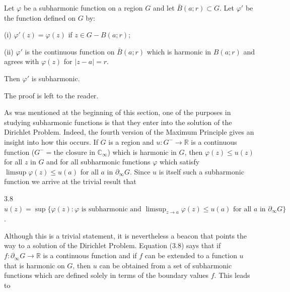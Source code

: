 Let $\varphi$ be a subharmonic function on a region $G$ and let $\bar{B}(a; r) \subset G$. Let $\varphi'$ be the function defined on $G$ by:

(i) $\varphi'(z) = \varphi(z)$ if $z \in G - B(a; r)$;

(ii) $\varphi'$ is the continuous function on $\bar{B}(a; r)$ which is harmonic in $B(a; r)$ and agrees with $\varphi(z)$ for $|z - a| = r$.

Then $\varphi'$ is subharmonic.

The proof is left to the reader.

As was mentioned at the beginning of this section, one of the purposes in studying subharmonic functions is that they enter into the solution of the Dirichlet Problem. Indeed, the fourth version of the Maximum Principle gives an insight into how this occurs. If $G$ is a region and $u: G^- \to \mathbb{R}$ is a continuous function ($G^- = \text{the closure in } \mathbb{C}_\infty$) which is harmonic in $G$, then $\varphi(z) \leq u(z)$ for all $z$ in $G$ and for all subharmonic functions $\varphi$ which satisfy $\limsup \varphi(z) \leq u(a)$ for all $a$ in $\partial_\infty G$. Since $u$ is itself such a subharmonic function we arrive at the trivial result that

3.8 $u(z) = \sup \{ \varphi(z): \varphi \text{ is subharmonic and } \limsup_{z \to a} \varphi(z) \leq u(a) \text{ for all } a \text{ in } \partial_\infty G \}$.

Although this is a trivial statement, it is nevertheless a beacon that points the way to a solution of the Dirichlet Problem. Equation (3.8) says that if $f: \partial_\infty G \to \mathbb{R}$ is a continuous function and if $f$ can be extended to a function $u$ that is harmonic on $G$, then $u$ can be obtained from a set of subharmonic functions which are defined solely in terms of the boundary values $f$. This leads to